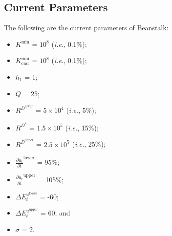 \documentclass[class=article, crop=false]{standalone}
\begin{document}
\subsection{Current Parameters}
The following are the current parameters of Beanstalk:
\begin{itemize}[itemsep=3pt,leftmargin=16pt]
    \item \hyperlink{ht119}{$K^{\text{min}}$} = $10^8$ (\textit{i.e.}, 0.1\%);
    \item $K_{\text{end}}^{\text{min}}$ = $10^8$ (\textit{i.e.}, 0.1\%);
    \item $h_1$ = 1;
    \item $Q$ = 25;
    \item $R^{D^{\text{lower}}}$ = $5 \times 10^4$ (\textit{i.e.}, 5\%);
    \item $R^{D^*}$ = $1.5 \times 10^5$ (\textit{i.e.}, 15\%);
    \item $R^{D^{\text{upper}}}$ = $2.5 \times 10^5$ (\textit{i.e.}, 25\%);
    \item $\frac{\partial u_t}{\partial t}^{\text{lower}}$ = 95\%;
    \item $\frac{\partial u_t}{\partial t}^{\text{upper}}$ = 105\%;
    \item $\Delta E_{t}^{u^{\text{lower}}}$ = -60;
    \item $\Delta E_{t}^{u^{\text{upper}}}$ = 60; and
    \item $\sigma$ = 2.
\end{itemize}
\end{document}
